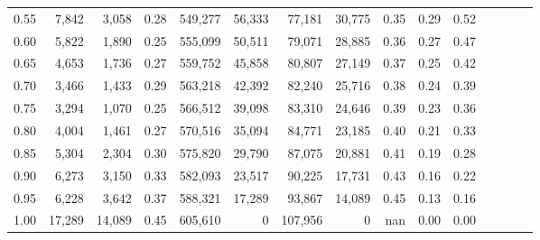 \begin{tabular}{rrrcrrrrrrrrrrr}
0.55 &    7,842 &   3,058 &                                       0.28 &  549,277 &   56,333 &   77,181 &   30,775 &  0.35 &  0.29 &                         0.52 \\
0.60 &    5,822 &   1,890 &                                       0.25 &  555,099 &   50,511 &   79,071 &   28,885 &  0.36 &  0.27 &                         0.47 \\
0.65 &    4,653 &   1,736 &                                       0.27 &  559,752 &   45,858 &   80,807 &   27,149 &  0.37 &  0.25 &                         0.42 \\
0.70 &    3,466 &   1,433 &                                       0.29 &  563,218 &   42,392 &   82,240 &   25,716 &  0.38 &  0.24 &                         0.39 \\
0.75 &    3,294 &   1,070 &                                       0.25 &  566,512 &   39,098 &   83,310 &   24,646 &  0.39 &  0.23 &                         0.36 \\
0.80 &    4,004 &   1,461 &                                       0.27 &  570,516 &   35,094 &   84,771 &   23,185 &  0.40 &  0.21 &                         0.33 \\
0.85 &    5,304 &   2,304 &                                       0.30 &  575,820 &   29,790 &   87,075 &   20,881 &  0.41 &  0.19 &                         0.28 \\
0.90 &    6,273 &   3,150 &                                       0.33 &  582,093 &   23,517 &   90,225 &   17,731 &  0.43 &  0.16 &                         0.22 \\
0.95 &    6,228 &   3,642 &                                       0.37 &  588,321 &   17,289 &   93,867 &   14,089 &  0.45 &  0.13 &                         0.16 \\
1.00 &   17,289 &  14,089 &                                       0.45 &  605,610 &        0 &  107,956 &        0 &   nan &  0.00 &                         0.00 \\
\bottomrule
\end{tabular}
